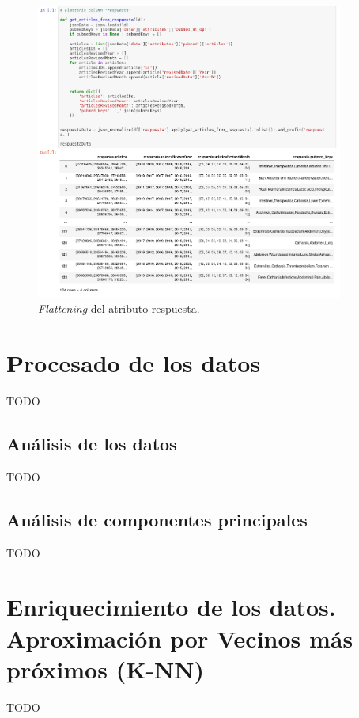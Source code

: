 \documentclass[10pt,a4paper,oneside]{book}
\begin{document}
\paragraph{}
\begin{figure}[!htb]
  \centering
  \includegraphics[width=0.9\textwidth]{images/metodologia-aplanar-respuesta.png}
  \caption{\textit{Flattening} del atributo respuesta.}
\end{figure}



\newpage
\section{Procesado de los datos}
TODO

\subsection{Análisis de los datos}
TODO

\subsection{Análisis de componentes principales}
TODO

\newpage
\section{Enriquecimiento de los datos. Aproximación por Vecinos más próximos (K-NN)}
TODO
\end{document}
